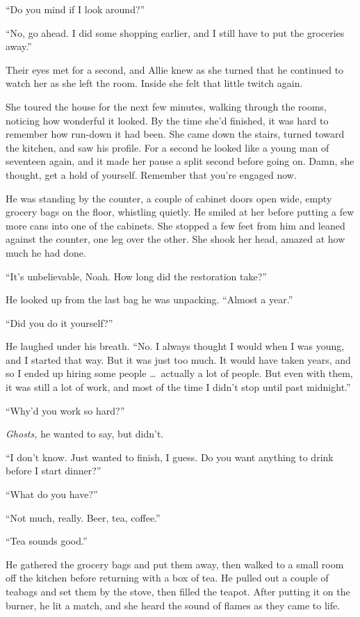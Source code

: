 \documentclass[10pt, twoside, openright]{book}
\begin{document}
``Do you mind if I look around?''


``No, go ahead. I did some shopping earlier, and I still have to put the
groceries away.''

Their eyes met for a second, and Allie knew as she turned that he
continued to watch her as she left the room. Inside she felt that little
twitch again.

She toured the house for the next few minutes, walking through the
rooms, noticing how wonderful it looked. By the time she'd finished, it
was hard to remember how run-down it had been. She came down the stairs,
turned toward the kitchen, and saw his profile. For a second he looked
like a young man of seventeen again, and it made her pause a split
second before going on. Damn, she thought, get a hold of yourself.
Remember that you're engaged now.

He was standing by the counter, a couple of cabinet doors open wide,
empty grocery bags on the floor, whistling quietly. He smiled at her
before putting a few more cans into one of the cabinets. She stopped a
few feet from him and leaned against the counter, one leg over the
other. She shook her head, amazed at how much he had done.


``It's unbelievable, Noah. How long did the restoration take?''

He looked up from the last bag he was unpacking. ``Almost a year.''

``Did you do it yourself?''


He laughed under his breath. ``No. I always thought I would when I was
young, and I started that way. But it was just too much. It would have
taken years, and so I ended up hiring some people   \dots\ actually a lot
of people. But even with them, it was still a lot of work, and most of
the time I didn't stop until past midnight.''


``Why'd you work so hard?''

\emph{Ghosts,} he wanted to say, but didn't.


``I don't know. Just wanted to finish, I guess. Do you want anything to
drink before I start dinner?''


``What do you have?''

``Not much, really. Beer, tea, coffee.''

``Tea sounds good.''


He gathered the grocery bags and put them away, then walked to a small
room off the kitchen before returning with a box of tea. He pulled out a
couple of teabags and set them by the stove, then filled the teapot.
After putting it on the burner, he lit a match, and she heard the sound
of flames as they came to life.
\end{document}

